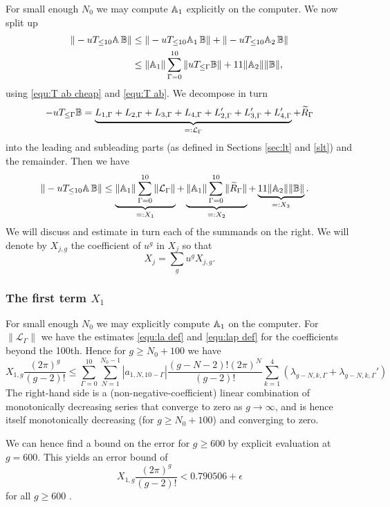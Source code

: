 \documentclass[12pt]{amsart}
\theoremstyle{definition}
\numberwithin{equation}{section}
\renewcommand{\tilde}{\widetilde}
\newcommand{\cL}{\mathcal{L}}
\newcommand{\numcheck}[1]{\cite[Computation #1]{SupplementaryNotebook}}
\theoremstyle{definition} %
\theoremstyle{remark}
\begin{document}
For small enough $N_0$ we may compute $\mathbb{A}_1$ explicitly on the computer.
We now split up
\begin{align*}
    \|-uT_{\leq 10}\mathbb{A}\, \mathbb{B} \|
    &\leq
    \|-uT_{\leq 10}\mathbb{A}_1\, \mathbb{B} \|
    +
    \|-uT_{\leq 10}\mathbb{A}_2\, \mathbb{B} \|
\\
&\leq \|\mathbb{A}_1\|
    \sum_{\Gamma=0}^{10}
    \|uT_{\leq \Gamma}\mathbb{B} \|
    +
    11 \|\mathbb{A}_2\| \|\mathbb{B}\|,
\end{align*}
using \eqref{equ:T ab cheap} and \eqref{equ:T ab}. 
We decompose in turn 
\[
    -uT_{\leq \Gamma}\bbB =
    \underbrace{L_{1,\Gamma}+L_{2,\Gamma}+L_{3,\Gamma}+L_{4,\Gamma} + L_{2,\Gamma}'+L_{3,\Gamma}'+L_{4,\Gamma}'}_{=:\cL_\Gamma}
    +
    \tilde R_\Gamma
\]
into the leading and subleading parts (as defined in Sections \ref{sec:lt} and \ref{slt}) and the remainder.
Then we have 
\begin{align*}
    \|-uT_{\leq 10}\bbA\, \bbB \|
&\leq \underbrace{\|\bbA_1\|
    \sum_{\Gamma=0}^{10}
    \|\cL_\Gamma \|}_{=:X_1}
    +
    \underbrace{\|\bbA_1\|
    \sum_{\Gamma=0}^{10}
    \|\tilde R_\Gamma \|}_{=:X_2}
    +
    \underbrace{11 \|\bbA_2\| \|\bbB\|}_{=:X_3}.
\end{align*}
We will discuss and estimate in turn each of the summands on the right.
We will denote by $X_{j,g}$ the coefficient of $u^g$ in $X_j$ so that 
\[
    X_{j} = \sum_g u^g X_{j,g}.
\]

\subsubsection{The first term $X_1$}
For small enough $N_0$ we may explicitly compute $\mathbb{A}_1$ on the computer.
For $\|\cL_\Gamma \|$ we have the estimates \eqref{equ:la def} and \eqref{equ:lap def} for the coefficients beyond the 100th.
Hence for $g\geq N_0+100$ we have 
\[
    X_{1,g}\frac{(2\pi)^g}{(g-2)!}
    \leq 
    \sum_{\Gamma=0}^{10}
    \sum_{N=1}^{N_0-1}
    |a_{1,N,10-\Gamma}| \frac{(g-N-2)! (2\pi)^N}{(g-2)!}
    \sum_{k=1}^4 (\lambda_{g-N,k,\Gamma}+\lambda_{g-N,k,\Gamma}')
\]
The right-hand side is a (non-negative-coefficient) linear combination of monotonically decreasing series that converge to zero as $g\to \infty$, and is hence itself monotonically decreasing (for $g\geq N_0+100$) and converging to zero.

We can hence find a bound on the error for $g\geq 600$ by explicit evaluation at $g=600$.
This yields an error bound of 
\[
    X_{1,g}\frac{(2\pi)^g}{(g-2)!} < 0.790506+\epsilon
\]
for all $g\geq 600$ \numcheck{XEVAL}.
\end{document}
